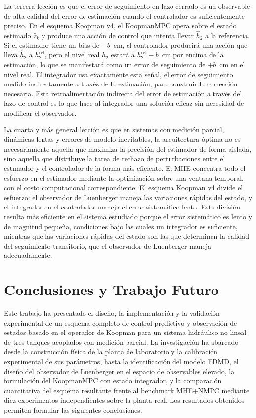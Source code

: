 \documentclass[12pt,letterpaper]{article}
\begin{document}
La tercera lección es que el error de seguimiento en lazo cerrado 
es un observable de alta calidad del error de estimación cuando 
el controlador es suficientemente preciso. En el esquema Koopman 
v4, el KoopmanMPC opera sobre el estado estimado $\hat{z}_k$ y 
produce una acción de control que intenta llevar $\hat{h}_2$ a 
la referencia. Si el estimador tiene un bias de $-b$~cm, el 
controlador producirá una acción que lleva $\hat{h}_2$ a 
$h_2^{\mathrm{ref}}$, pero el nivel real $h_2$ estará a 
$h_2^{\mathrm{ref}} - b$~cm por encima de la estimación, lo que 
se manifestará como un error de seguimiento de $+b$~cm en el 
nivel real. El integrador usa exactamente esta señal, el error
de seguimiento medido indirectamente a través de la estimación,
para construir la corrección necesaria. Esta retroalimentación 
indirecta del error de estimación a través del lazo de control 
es lo que hace al integrador una solución eficaz sin necesidad 
de modificar el observador.

La cuarta y más general lección es que en sistemas con medición 
parcial, dinámicas lentas y errores de modelo inevitables, la 
arquitectura óptima no es necesariamente aquella que maximiza 
la precisión del estimador de forma aislada, sino aquella que 
distribuye la tarea de rechazo de perturbaciones entre el 
estimador y el controlador de la forma más eficiente. El MHE 
concentra todo el esfuerzo en el estimador mediante la 
optimización sobre una ventana temporal, con el costo 
computacional correspondiente. El esquema Koopman v4 divide 
el esfuerzo: el observador de Luenberger maneja las variaciones 
rápidas del estado, y el integrador en el controlador maneja 
el error sistemático lento. Esta división resulta más eficiente 
en el sistema estudiado porque el error sistemático es lento y 
de magnitud pequeña, condiciones bajo las cuales un integrador
es suficiente, mientras que las variaciones rápidas del estado
son las que determinan la calidad del seguimiento transitorio, 
que el observador de Luenberger maneja adecuadamente.





\section{Conclusiones y Trabajo Futuro}
\label{sec:conclusiones}

Este trabajo ha presentado el diseño, la implementación y la 
validación experimental de un esquema completo de control 
predictivo y observación de estados basado en el operador de 
Koopman para un sistema hidráulico no lineal de tres tanques 
acoplados con medición parcial. La investigación ha abarcado 
desde la construcción física de la planta de laboratorio y la 
calibración experimental de sus parámetros, hasta la 
identificación del modelo EDMD, el diseño del observador de 
Luenberger en el espacio de observables elevado, la formulación 
del KoopmanMPC con estado integrador, y la comparación 
cuantitativa del esquema resultante frente al benchmark MHE+NMPC 
mediante diez experimentos independientes sobre la planta 
real. Los resultados obtenidos permiten formular las siguientes 
conclusiones.
\end{document}
